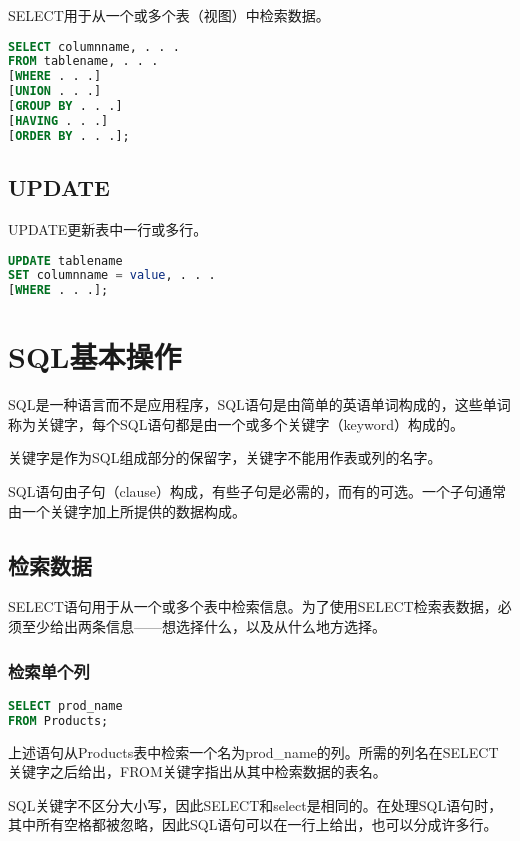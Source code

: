 SELECT用于从一个或多个表（视图）中检索数据。

\begin{lstlisting}[language=SQL]
SELECT columnname, . . .
FROM tablename, . . .
[WHERE . . .]
[UNION . . .]
[GROUP BY . . .]
[HAVING . . .]
[ORDER BY . . .];
\end{lstlisting}


\section{UPDATE}

UPDATE更新表中一行或多行。

\begin{lstlisting}[language=SQL]
UPDATE tablename
SET columnname = value, . . .
[WHERE . . .];
\end{lstlisting}
\chapter{SQL基本操作}

SQL是一种语言而不是应用程序，SQL语句是由简单的英语单词构成的，这些单词称为关键字，每个SQL语句都是由一个或多个关键字（keyword）构成的。

关键字是作为SQL组成部分的保留字，关键字不能用作表或列的名字。

SQL语句由子句（clause）构成，有些子句是必需的，而有的可选。一个子句通常由一个关键字加上所提供的数据构成。
\section{检索数据}

SELECT语句用于从一个或多个表中检索信息。为了使用SELECT检索表数据，必须至少给出两条信息——想选择什么，以及从什么地方选择。


\subsection{检索单个列}


\begin{lstlisting}[language=SQL]
SELECT prod_name
FROM Products;
\end{lstlisting}



上述语句从Products表中检索一个名为prod\_name的列。所需的列名在SELECT关键字之后给出，FROM关键字指出从其中检索数据的表名。

SQL关键字不区分大小写，因此SELECT和select是相同的。在处理SQL语句时，其中所有空格都被忽略，因此SQL语句可以在一行上给出，也可以分成许多行。


